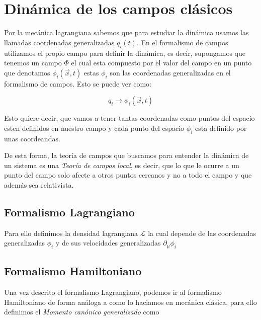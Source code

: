 \begin{example}
  
\end{example}
\begin{example}
  
\end{example}
\begin{example}
  
\end{example}
\begin{example}
  
\end{example}
\section{Dinámica de los campos clásicos}

Por la mecánica lagrangiana sabemos que para estudiar la dinámica usamos las llamadas coordenadas generalizadas $q_{i}(t)$. En el formalismo de campos utilizamos el propio campo para definir la dinámica, es decir, supongamos que tenemos un campo $\Phi$ el cual esta compuesto por el valor del campo en un punto que denotamos $\phi_{i}(\vec{x},t)$ estas $\phi_{i}$ son las coordenadas generalizadas en el formalismo de campos. Esto se puede ver como:

\[q_{i}\to\phi_{i}(\vec{x},t)\]

Esto quiere decir, que vamos a tener tantas coordenadas como puntos del espacio esten definidos en nuestro campo y cada punto del espacio $\phi_{i}$ esta definido por unas coordeandas. 

De esta forma, la teoría de campos que buscamos para entender la dinámica de un sistema es una \textit{Teoría de campos local}, es decir, que lo que le ocurre a un punto del campo solo afecte a otros puntos cercanos y no a todo el campo y que además sea relativista.
\subsection{Formalismo Lagrangiano}
Para ello definimos la densidad lagrangiana $\mathcal{L}$ la cual depende de las coordenadas generalizadas $\phi_{i}$ y de sus velocidades generalizadas $\partial_{\mu}\phi_{i}$
\subsection{Formalismo Hamiltoniano}

Una vez descrito el formalismo Lagrangiano, podemos ir al formalismo Hamiltoniano de forma análoga a como lo haciamos en mecánica clásica, para ello definimos el \textit{Momento canónico generalizado} como 

